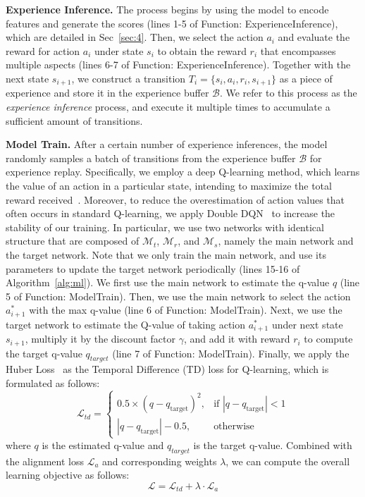 \noindent \textbf{Experience Inference.} The process begins by using the model to encode features and generate the scores (lines 1-5 of Function: ExperienceInference), which are detailed in Sec~\ref{sec:4}. Then, we select the action $a_i$ and evaluate the reward for action $a_i$ under state $s_i$ to obtain the reward $r_i$ that encompasses multiple aspects (lines 6-7 of Function: ExperienceInference). Together with the next state $s_{i+1}$, we construct a transition $T_i = \{s_i, a_i, r_i, s_{i+1}\}$ as a piece of experience and store it in the experience buffer $\mathcal{B}$. We refer to this process as the \textit{experience inference} process, and execute it multiple times to accumulate a sufficient amount of transitions.

\noindent \textbf{Model Train.} After a certain number of experience inferences, the model randomly samples a batch of transitions from the experience buffer $\mathcal{B}$ for experience replay. Specifically, we employ a deep Q-learning method, which learns the value of an action in a particular state, intending to maximize the total reward received~\cite{dqn}. Moreover, to reduce the overestimation of action values that often occurs in standard Q-learning, we apply Double DQN~\cite{double_dqn} to increase the stability of our training. In particular, we use two networks with identical structure that are composed of $\mathcal{M}_t$, $\mathcal{M}_r$, and $\mathcal{M}_s$, namely the main network and the target network. Note that we only train the main network, and use its parameters to update the target network periodically (lines 15-16 of Algorithm~\ref{alg:ml}). We first use the main network to estimate the q-value $q$ (line 5 of Function: ModelTrain). Then, we use the main network to select the action $a_{i+1}^*$ with the max q-value (line 6 of Function: ModelTrain). Next, we use the target network to estimate the Q-value of taking action $a_{i+1}^*$ under next state $s_{i+1}$, multiply it by the discount factor $\gamma$, and add it with reward $r_i$ to compute the target q-value $q_{target}$ (line 7 of Function: ModelTrain). Finally, we apply the Huber Loss~\cite{huber} as the Temporal Difference (TD) loss for Q-learning, which is formulated as follows:
\begin{equation}
    \mathcal{L}_{td} = 
    \begin{cases} 
    0.5 \times (q - q_{\text{target}})^2, & \text{if } |q - q_{\text{target}}| < 1 \\
    |q - q_{\text{target}}| - 0.5, & \text{otherwise}
    \end{cases}
\end{equation}
where $q$ is the estimated q-value and $q_{target}$ is the target q-value. Combined with the alignment loss $\mathcal{L}_a$ and corresponding weights $\lambda$, we can compute the overall learning objective as follows:
\begin{equation}
    \mathcal{L} = \mathcal{L}_{td} + \lambda \cdot \mathcal{L}_a
\end{equation}


